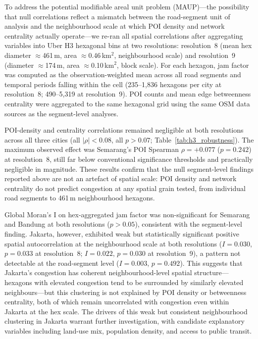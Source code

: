 \documentclass[12pt,a4paper]{article}
\begin{document}
To address the potential modifiable areal unit problem (MAUP)---the possibility that null correlations reflect a mismatch between the road-segment unit of analysis and the neighbourhood scale at which POI density and network centrality actually operate---we re-ran all spatial correlations after aggregating variables into Uber H3 hexagonal bins at two resolutions: resolution~8 (mean hex diameter $\approx$461\,m, area $\approx$0.46\,km$^2$, neighbourhood scale) and resolution~9 (diameter $\approx$174\,m, area $\approx$0.10\,km$^2$, block scale). For each hexagon, jam factor was computed as the observation-weighted mean across all road segments and temporal periods falling within the cell (235--1,836 hexagons per city at resolution~8; 490--5,319 at resolution~9). POI counts and mean edge betweenness centrality were aggregated to the same hexagonal grid using the same OSM data sources as the segment-level analyses.

POI-density and centrality correlations remained negligible at both resolutions across all three cities (all $|\rho| < 0.08$, all $p > 0.07$; Table~\ref{tab:h3_robustness}). The maximum observed effect was Semarang's POI Spearman $\rho = +0.077$ ($p = 0.242$) at resolution~8, still far below conventional significance thresholds and practically negligible in magnitude. These results confirm that the null segment-level findings reported above are not an artefact of spatial scale: POI density and network centrality do not predict congestion at any spatial grain tested, from individual road segments to 461\,m neighbourhood hexagons.

Global Moran's I on hex-aggregated jam factor was non-significant for Semarang and Bandung at both resolutions ($p > 0.05$), consistent with the segment-level finding. Jakarta, however, exhibited weak but statistically significant positive spatial autocorrelation at the neighbourhood scale at both resolutions ($I = 0.030$, $p = 0.033$ at resolution~8; $I = 0.022$, $p = 0.030$ at resolution~9), a pattern not detectable at the road-segment level ($I = 0.003$, $p = 0.492$). This suggests that Jakarta's congestion has coherent neighbourhood-level spatial structure---hexagons with elevated congestion tend to be surrounded by similarly elevated neighbours---but this clustering is not explained by POI density or betweenness centrality, both of which remain uncorrelated with congestion even within Jakarta at the hex scale. The drivers of this weak but consistent neighbourhood clustering in Jakarta warrant further investigation, with candidate explanatory variables including land-use mix, population density, and access to public transit.
\end{document}
